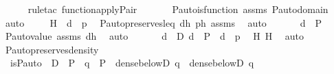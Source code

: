 \begin{isabellebody}
\ \ \ \ \isamarkupfalse%
\ {\isacharparenleft}{\kern0pt}rule{\isacharunderscore}{\kern0pt}tac\ function{\isacharunderscore}{\kern0pt}apply{\isacharunderscore}{\kern0pt}Pair{\isacharparenright}{\kern0pt}\ \isanewline
\ \ \ \ \isamarkupfalse%
\ P{\isacharunderscore}{\kern0pt}auto{\isacharunderscore}{\kern0pt}is{\isacharunderscore}{\kern0pt}function\ assms\ P{\isacharunderscore}{\kern0pt}auto{\isacharunderscore}{\kern0pt}domain\ \isamarkupfalse%
\ auto\ \isamarkupfalse%
\isanewline
\ \ \isamarkupfalse%
\ H{}\ {\isacharcolon}{\kern0pt}\ {\isachardoublequoteopen}{\isasympi}{\isacharbackquote}{\kern0pt}d\ {\isasympreceq}\ p{\isachardoublequoteclose}\ \isamarkupfalse%
\ P{\isacharunderscore}{\kern0pt}auto{\isacharunderscore}{\kern0pt}preserves{\isacharunderscore}{\kern0pt}leq\ dh\ p{\isacharprime}{\kern0pt}h\ assms\ \isamarkupfalse%
\ auto\ \isamarkupfalse%
\ \isanewline
\ \ \isamarkupfalse%
\ {\isachardoublequoteopen}{\isasympi}{\isacharbackquote}{\kern0pt}d\ {\isasymin}\ P{\isachardoublequoteclose}\ \isamarkupfalse%
\ P{\isacharunderscore}{\kern0pt}auto{\isacharunderscore}{\kern0pt}value\ assms\ dh\ \isamarkupfalse%
\ auto\ \isanewline
\ \ \isamarkupfalse%
\ \isamarkupfalse%
\ {\isachardoublequoteopen}{\isasymexists}d{\isasymin}{\isasympi}\ {\isacharbackquote}{\kern0pt}{\isacharbackquote}{\kern0pt}\ D{\isachardot}{\kern0pt}\ d\ {\isasymin}\ P\ {\isasymand}\ d\ {\isasympreceq}\ p{\isachardoublequoteclose}\ \isamarkupfalse%
\ H\ H{}\ \isamarkupfalse%
\ auto\ \isanewline
{}\isamarkupfalse%
%
\endisatagproof
{\isafoldproof}%
%
\isadelimproof
\isanewline
%
\endisadelimproof
\isanewline
{}\isamarkupfalse%
\ P{\isacharunderscore}{\kern0pt}auto{\isacharunderscore}{\kern0pt}preserves{\isacharunderscore}{\kern0pt}density{\isacharprime}{\kern0pt}\ {\isacharcolon}{\kern0pt}\ \isanewline
\ \ {\isachardoublequoteopen}is{\isacharunderscore}{\kern0pt}P{\isacharunderscore}{\kern0pt}auto{\isacharparenleft}{\kern0pt}{\isasympi}{\isacharparenright}{\kern0pt}\ {\isasymLongrightarrow}\ D\ {\isasymsubseteq}\ P\ {\isasymLongrightarrow}\ q\ {\isasymin}\ P\ {\isasymLongrightarrow}\ dense{\isacharunderscore}{\kern0pt}below{\isacharparenleft}{\kern0pt}D{\isacharcomma}{\kern0pt}\ q{\isacharparenright}{\kern0pt}\ {\isasymlongleftrightarrow}\ dense{\isacharunderscore}{\kern0pt}below{\isacharparenleft}{\kern0pt}{\isasympi}{\isacharbackquote}{\kern0pt}{\isacharbackquote}{\kern0pt}D{\isacharcomma}{\kern0pt}\ {\isasympi}{\isacharbackquote}{\kern0pt}q{\isacharparenright}{\kern0pt}{\isachardoublequoteclose}\ \isanewline

\end{isabellebody}
